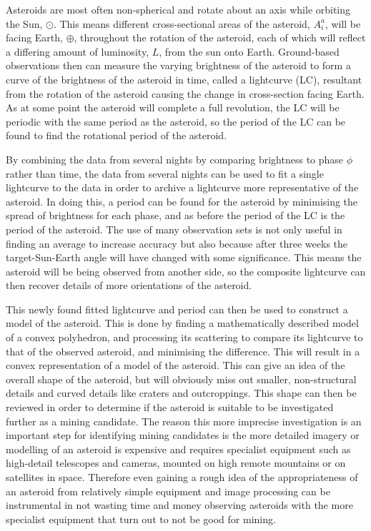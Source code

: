 \documentclass[10pt,twocolumn]{revtex4}    %
\newcommand*{\astrosun}{{\odot}}
\newcommand*{\earth}{{\oplus}}
\begin{document}
Asteroids are most often non-spherical and rotate about an axis while orbiting the Sun, $\astrosun$. This means different cross-sectional areas of the asteroid, $A^a_i$, will be facing Earth, $\earth$, throughout the rotation of the asteroid, each of which will reflect a differing amount of luminosity, $L$, from the sun onto Earth. Ground-based observations then can measure the varying brightness of the asteroid to form a curve of the brightness of the asteroid in time, called a lightcurve (LC), resultant from the rotation of the asteroid causing the change in cross-section facing Earth. As at some point the asteroid will complete a full revolution, the LC will be periodic with the same period as the asteroid, so the period of the LC can be found to find the rotational period of the asteroid.

By combining the data from several nights by comparing brightness to phase $\phi$ rather than time, the data from several nights can be used to fit a single lightcurve to the data in order to archive a lightcurve more representative of the asteroid. In doing this, a period can be found for the asteroid by minimising the spread of brightness for each phase, and as before the period of the LC is the period of the asteroid. The use of many observation sets is not only useful in finding an average to increase accuracy but also because after three weeks the target-Sun-Earth angle will have changed with some significance. This means the asteroid will be being observed from another side, so the composite lightcurve can then recover details of more orientations of the asteroid. 

This newly found fitted lightcurve and period can then be used to construct a model of the asteroid. This is done by finding a mathematically described model of a convex polyhedron, and processing its scattering to compare its lightcurve to that of the observed asteroid, and minimising the difference. This will result in a convex representation of a model of the asteroid. This can give an idea of the overall shape of the asteroid, but will obviously miss out smaller, non-structural details and curved details like craters and outcroppings. This shape can then be reviewed in order to determine if the asteroid is suitable to be investigated further as a mining candidate. 
The reason this more imprecise investigation is an important step for identifying mining candidates is the more detailed imagery or modelling of an asteroid is expensive and requires specialist equipment such as high-detail telescopes and cameras, mounted on high remote mountains or on satellites in space. Therefore even gaining a rough idea of the appropriateness of an asteroid from relatively simple equipment and image processing can be instrumental in not wasting time and money observing asteroids with the more specialist equipment that turn out to not be good for mining. 
\end{document}
